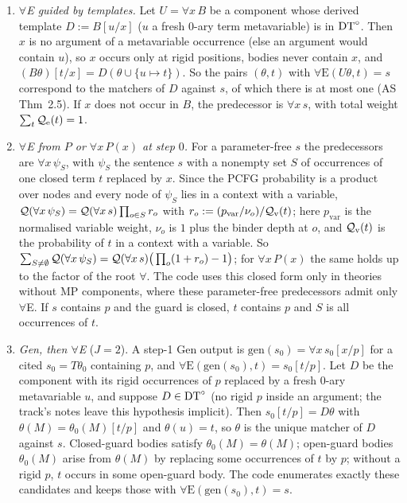 \begin{enumerate}[label=(d\arabic*),leftmargin=*,itemsep=1pt]
\item \emph{$\forall$E guided by templates.} Let $U=\forall x\,B$ be a component whose derived template $D:=B[u/x]$ ($u$ a fresh $0$-ary term metavariable) is in $\mathrm{DT}^{\circ}$. Then $x$ is no argument of a metavariable occurrence (else an argument would contain $u$), so $x$ occurs only at rigid positions, bodies never contain $x$, and $(B\theta)[t/x]=D(\theta\cup\{u\mapsto t\})$. So the pairs $(\theta,t)$ with $\forall\mathrm E(U\theta,t)=s$ correspond to the matchers of $D$ against $s$, of which there is at most one (AS Thm~2.5). If $x$ does not occur in $B$, the predecessor is $\forall x\,s$, with total weight $\sum_t\mathcal{Q}_{\mathrm{e}}(t)=1$.
\item \emph{$\forall$E from $P$ or $\forall x\,P(x)$ at step $0$.} For a parameter-free $s$ the predecessors are $\forall x\,\psi_S$, with $\psi_S$ the sentence $s$ with a nonempty set $S$ of occurrences of one closed term $t$ replaced by $x$. Since the PCFG probability is a product over nodes and every node of $\psi_S$ lies in a context with a variable, $\mathcal{Q}(\forall x\,\psi_S)=\mathcal{Q}(\forall x\,s)\prod_{o\in S}r_o$ with $r_o:=(p_{\mathrm{var}}/\nu_o)/\mathcal{Q}_{\mathrm v}(t)$; here $p_{\mathrm{var}}$ is the normalised variable weight, $\nu_o$ is $1$ plus the binder depth at $o$, and $\mathcal{Q}_{\mathrm v}(t)$ is the probability of $t$ in a context with a variable. So $\sum_{S\ne\emptyset}\mathcal{Q}(\forall x\,\psi_S)=\mathcal{Q}(\forall x\,s)\big(\prod_o(1+r_o)-1\big)$; for $\forall x\,P(x)$ the same holds up to the factor of the root $\forall$. The code uses this closed form only in theories without MP components, where these parameter-free predecessors admit only $\forall$E. If $s$ contains $p$ and the guard is closed, $t$ contains $p$ and $S$ is all occurrences of $t$.
\item \emph{Gen, then $\forall$E} ($J=2$). A step-1 Gen output is $\mathrm{gen}(s_0)=\forall x\,s_0[x/p]$ for a cited $s_0=T\theta_0$ containing $p$, and $\forall\mathrm E(\mathrm{gen}(s_0),t)=s_0[t/p]$. Let $D$ be the component with its rigid occurrences of $p$ replaced by a fresh $0$-ary metavariable $u$, and suppose $D\in\mathrm{DT}^{\circ}$ (no rigid $p$ inside an argument; the track's notes leave this hypothesis implicit). Then $s_0[t/p]=D\theta$ with $\theta(M)=\theta_0(M)[t/p]$ and $\theta(u)=t$, so $\theta$ is the unique matcher of $D$ against $s$. Closed-guard bodies satisfy $\theta_0(M)=\theta(M)$; open-guard bodies $\theta_0(M)$ arise from $\theta(M)$ by replacing some occurrences of $t$ by $p$; without a rigid $p$, $t$ occurs in some open-guard body. The code enumerates exactly these candidates and keeps those with $\forall\mathrm E(\mathrm{gen}(s_0),t)=s$.

\end{enumerate}
